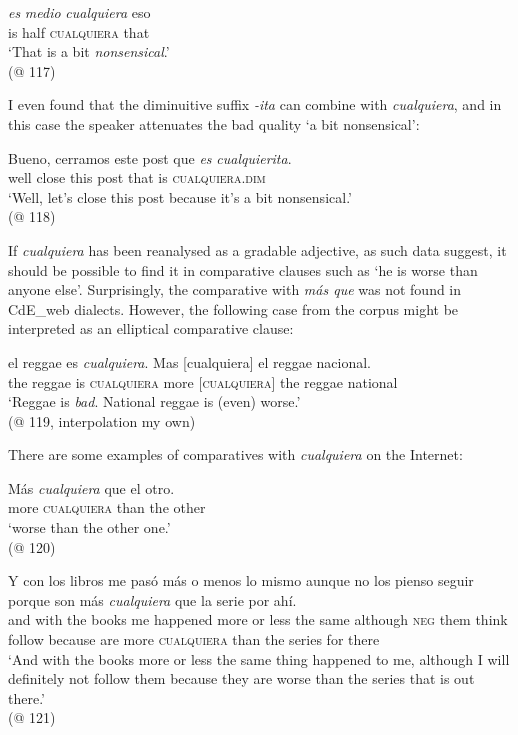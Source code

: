\ea \label{bkm:Ref150786457}  %
\gll \textit{es} \textit{medio} \textit{cualquiera} eso\\
    is half \textsc{cualquiera} that\\
\glt ‘That is a bit \textit{nonsensical}.’\\
    (@ 117)
\z

I even found that the diminuitive suffix \textit{-ita} can combine with \textit{cualquiera}, and in this case the speaker attenuates the bad quality ‘a bit nonsensical’:

\ea \label{ex:key:205} %
    \gll Bueno, cerramos este post que \textit{es}  \textit{cualquierita}.\\
    well close this post that is \textsc{cualquiera}.\textsc{dim}\\
    \glt ‘Well, let’s close this post because it’s a bit nonsensical.’\\
    (@ 118)
\z

If \textit{cualquiera} has been reanalysed as a gradable adjective, as such data suggest, it should be possible to find it in comparative clauses such as ‘he is worse than anyone else’. Surprisingly, the comparative with \textit{más que} was not found in CdE\_web dialects. However, the following case from the corpus might be interpreted as an elliptical comparative clause:

\ea \label{ex:key:206} %
    \gll el reggae es \textit{cualquiera}. Mas [cualquiera] el reggae nacional.\\
    the reggae is \textsc{cualquiera} more \textsc{[cualquiera]} the reggae national\\
    \glt ‘Reggae is \textit{bad}. National reggae is (even) worse.’\\
    (@ 119, interpolation my own)
\z

There are some examples of comparatives with \textit{cualquiera} on the Internet:

\ea \label{ex:key:207} %
    \gll Más \textit{cualquiera} que el otro.\\
    more \textsc{cualquiera} than the other\\
    \glt ‘worse than the other one.’\\
    (@ 120)
\z

\ea \label{ex:key:208} %
    \gll Y con los libros me pasó más o menos lo mismo aunque no los pienso seguir porque son más \textit{cualquiera} que la serie por ahí.\\
    and with the books me happened more or less the same although \textsc{neg} them think follow because are more \textsc{cualquiera} than the series for there\\
    \glt ‘And with the books more or less the same thing happened to me, although I will definitely not follow them because they are worse than the series that is out there.’\\
    (@ 121)
\z

